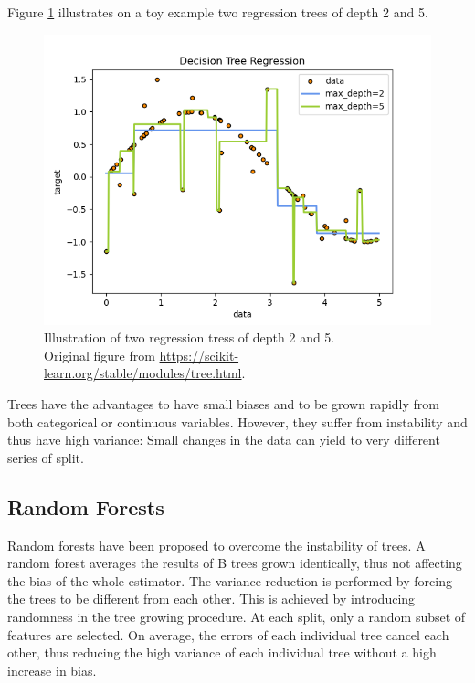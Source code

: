 \documentclass[french,12pt,twoside,a4paper]{book}
\begin{document}
\begin{appendices}
  Figure \ref{fig:tree_regression} illustrates on a toy example two regression
  trees of depth 2 and 5.

  \begin{figure}
    \centering
    \includegraphics{img/chapter_1/sphx_glr_plot_tree_regression_001.png}
    \caption{Illustration of two regression tress of depth 2 and 5.\\Original
      figure from \url{https://scikit-learn.org/stable/modules/tree.html}.}%
    \label{fig:tree_regression}
  \end{figure}

  Trees have the advantages to have small biases and to be grown rapidly from
  both categorical or continuous variables. However, they suffer from
  instability and thus have high variance: Small changes in the data can yield
  to very different series of split.

  \subsection{Random Forests}\label{apd:intro:random_forests}

  Random forests \citep{breiman2001random} have been proposed to overcome the
  instability of trees. A random forest averages the results of B trees grown
  identically, thus not affecting the bias of the whole estimator. The variance
  reduction is performed by forcing the trees to be different from each other.
  This is achieved by introducing randomness in the tree growing procedure. At
  each split, only a random subset of features are selected. On average, the
  errors of each individual tree cancel each other, thus reducing the high
  variance of each individual tree without a high increase in bias.


\end{appendices}
\end{document}
